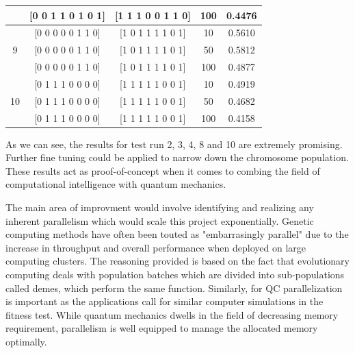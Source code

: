 \documentclass[conference]{IEEEtran}
\begin{document}
\begin{table}[!t]
{\begin{tabular}{| c | c | c | c | c |}
 & [0 0 1 1 0 1 0 1] & [1 1 1 0 0 1 1 0] & 100 & 0.4476 \\
\hline
 & [0 0 0 0 0 1 1 0] & [1 0 1 1 1 1 0 1] & 10 & 0.5610 \\
9 & [0 0 0 0 0 1 1 0] & [1 0 1 1 1 1 0 1] & 50 & 0.5812 \\
 & [0 0 0 0 0 1 1 0] & [1 0 1 1 1 1 0 1] & 100 & 0.4877 \\
\hline
 & [0 1 1 1 0 0 0 0] & [1 1 1 1 1 0 0 1] & 10  & 0.4919 \\
10 & [0 1 1 1 0 0 0 0] & [1 1 1 1 1 0 0 1] & 50  & 0.4682 \\
 & [0 1 1 1 0 0 0 0] & [1 1 1 1 1 0 0 1] & 100  & 0.4158 \\
\hline
\end{tabular}
}
\end{table}

As we can see, the results for test run 2, 3, 4, 8 and 10 are extremely promising. Further fine tuning could be applied to narrow down the chromosome population. These results act as proof-of-concept when it comes to combing the field of computational intelligence with quantum mechanics. 

The main area of improvment would involve identifying and realizing any inherent parallelism which would scale this project exponentially. Genetic computing methods have often been touted as "embarrasingly parallel" due to the increase in throughput and overall performance when deployed on large computing clusters. The reasoning provided is based on the fact that evolutionary computing deals with population batches which are divided into sub-populations called demes, which perform the same function. Similarly, for QC  parallelization is important as the applications call for similar computer simulations in the fitness test. While quantum mechanics dwells in the field of decreasing memory requirement, parallelism is well equipped to manage the allocated memory optimally.  
\end{document}
